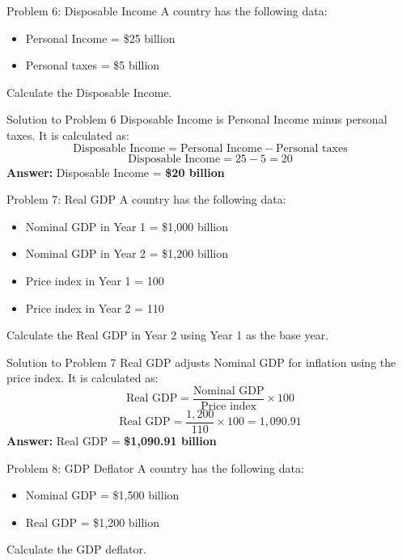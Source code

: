 \documentclass{beamer}
\begin{document}
\begin{frame}{Problem 6: Disposable Income}
A country has the following data:
\begin{itemize}
    \item Personal Income = \$25 billion
    \item Personal taxes = \$5 billion
\end{itemize}
Calculate the Disposable Income.
\end{frame}

\begin{frame}{Solution to Problem 6}
Disposable Income is Personal Income minus personal taxes. It is calculated as:
\[
\text{Disposable Income} = \text{Personal Income} - \text{Personal taxes}
\]
\[
\text{Disposable Income} = 25 - 5 = 20
\]
\textbf{Answer:} Disposable Income = \textbf{\$20 billion}
\end{frame}

\begin{frame}{Problem 7: Real GDP}
A country has the following data:
\begin{itemize}
    \item Nominal GDP in Year 1 = \$1,000 billion
    \item Nominal GDP in Year 2 = \$1,200 billion
    \item Price index in Year 1 = 100
    \item Price index in Year 2 = 110
\end{itemize}
Calculate the Real GDP in Year 2 using Year 1 as the base year.
\end{frame}

\begin{frame}{Solution to Problem 7}
Real GDP adjusts Nominal GDP for inflation using the price index. It is calculated as:
\[
\text{Real GDP} = \frac{\text{Nominal GDP}}{\text{Price index}} \times 100
\]
\[
\text{Real GDP} = \frac{1,200}{110} \times 100 = 1,090.91
\]
\textbf{Answer:} Real GDP = \textbf{\$1,090.91 billion}
\end{frame}

\begin{frame}{Problem 8: GDP Deflator}
A country has the following data:
\begin{itemize}
    \item Nominal GDP = \$1,500 billion
    \item Real GDP = \$1,200 billion
\end{itemize}
Calculate the GDP deflator.
\end{frame}
\end{document}
